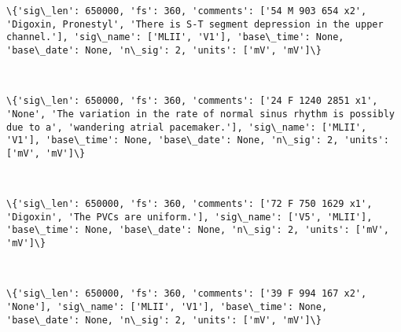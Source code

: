\documentclass[11pt]{article}
\begin{document}
    \begin{Verbatim}[commandchars=\\\{\}]
\{'sig\_len': 650000, 'fs': 360, 'comments': ['54 M 903 654 x2', 'Digoxin, Pronestyl', 'There is S-T segment depression in the upper channel.'], 'sig\_name': ['MLII', 'V1'], 'base\_time': None, 'base\_date': None, 'n\_sig': 2, 'units': ['mV', 'mV']\}

    \end{Verbatim}

    \begin{center}
    \end{center}
    { \hspace*{\fill} \\}
    
    \begin{Verbatim}[commandchars=\\\{\}]
\{'sig\_len': 650000, 'fs': 360, 'comments': ['24 F 1240 2851 x1', 'None', 'The variation in the rate of normal sinus rhythm is possibly due to a', 'wandering atrial pacemaker.'], 'sig\_name': ['MLII', 'V1'], 'base\_time': None, 'base\_date': None, 'n\_sig': 2, 'units': ['mV', 'mV']\}

    \end{Verbatim}

    \begin{center}
    \end{center}
    { \hspace*{\fill} \\}
    
    \begin{Verbatim}[commandchars=\\\{\}]
\{'sig\_len': 650000, 'fs': 360, 'comments': ['72 F 750 1629 x1', 'Digoxin', 'The PVCs are uniform.'], 'sig\_name': ['V5', 'MLII'], 'base\_time': None, 'base\_date': None, 'n\_sig': 2, 'units': ['mV', 'mV']\}

    \end{Verbatim}

    \begin{center}
    \end{center}
    { \hspace*{\fill} \\}
    
    \begin{Verbatim}[commandchars=\\\{\}]
\{'sig\_len': 650000, 'fs': 360, 'comments': ['39 F 994 167 x2', 'None'], 'sig\_name': ['MLII', 'V1'], 'base\_time': None, 'base\_date': None, 'n\_sig': 2, 'units': ['mV', 'mV']\}

    \end{Verbatim}
\end{document}
